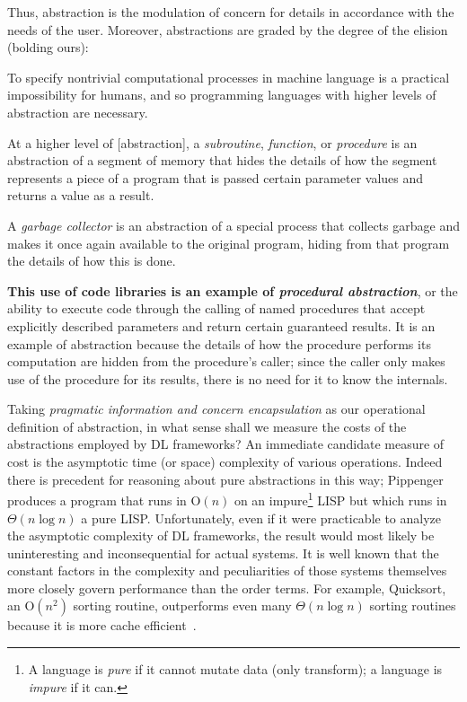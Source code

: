Thus, abstraction is the modulation of concern for details in accordance with the needs of the user.
Moreover, abstractions are graded by the degree of the elision (bolding ours):
\begin{displayquote}
    To specify nontrivial computational processes in machine language is a practical impossibility for humans, and so programming languages with higher levels of abstraction are necessary.

    \vspace{4pt}

    \textellipsis At a higher level of [abstraction], a \textit{subroutine}, \textit{function}, or \textit{procedure} is an abstraction of a segment of memory that hides the details of how the segment represents a piece of a program that is passed certain parameter values and returns a value as a result.

    \vspace{4pt}

    \textellipsis A \textit{garbage collector} is an abstraction of a special process that collects garbage and makes it once again available to the original program, hiding from that program the details of how this is done.


    \vspace{4pt}

    \textellipsis \textbf{This use of code libraries is an example of \textit{procedural abstraction}}, or the ability to execute code through the calling of named procedures that accept explicitly described parameters and return certain guaranteed results.
    It is an example of abstraction because the details of how the procedure performs its computation are hidden from the procedure's caller;
    since the caller only makes use of the procedure for its results, there is no need for it to know the internals.
\end{displayquote}


Taking \textit{pragmatic information and concern encapsulation} as our operational definition of abstraction, in what sense shall we measure the costs of the abstractions employed by DL frameworks?
An immediate candidate measure of cost is the asymptotic time (or space) complexity of various operations.
Indeed there is precedent for reasoning about pure abstractions in this way;
Pippenger~\cite{10.1145/244795.244798} produces a program that runs in O$(n)$ on an impure\footnote{A language is \textit{pure} if it cannot mutate data (only transform); a language is \textit{impure} if it can.} LISP but which runs in $\Theta(n \log n)$ a pure LISP\@.
Unfortunately, even if it were practicable to analyze the asymptotic complexity of DL frameworks, the result would most likely be uninteresting and inconsequential for actual systems.
It is well known that the constant factors in the complexity and peculiarities of those systems themselves more closely govern performance than the order terms.
For example, Quicksort, an O$\left(n^2\right)$ sorting routine, outperforms even many $\Theta(n\log n)$ sorting routines because it is more cache efficient~\cite{10.5555/1410219}.

